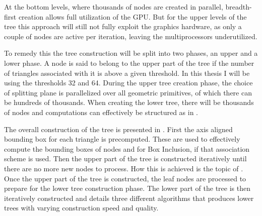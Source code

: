 
At the bottom levels, where thousands of nodes are created in parallel,
breadth-first creation allows full utilization of the GPU. But for the upper
levels of the tree this approach will still not fully exploit the graphics
hardware, as only a couple of nodes are active per iteration, leaving the
multiprocessors underutilized.

To remedy this the tree construction will be split into two phases, an upper and
a lower phase. A node is said to belong to the upper part of the tree if the
number of triangles associated with it is above a given threshold. In this
thesis I will be using the thresholds 32 and 64. During the upper tree creation
phase, the choice of splitting plane is parallelized over all geometric
primitives, of which there can be hundreds of thousands. When creating the lower
tree, there will be thousands of nodes and computations can effectively be
structured as in .


The overall construction of the tree is presented in
. First the axis aligned bounding box for each
triangle is precomputed. These are used to effectively compute the bounding
boxes of nodes and for Box Inclusion, if that association scheme is used. Then
the upper part of the tree is constructed iteratively until there are no more
new nodes to process. How this is achieved is the topic of
. Once the upper part of the tree is constructed, the
leaf nodes are processed to prepare for the lower tree construction phase. The
lower part of the tree is then iteratively constructed and
 details three different algorithms that produces
lower trees with varying construction speed and quality.


